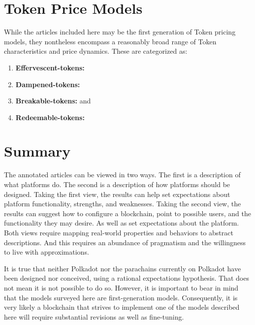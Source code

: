 \documentclass[11pt]{article}
\begin{document}
\section{Token Price Models}

While the articles included here may be the first generation of Token pricing models, they nontheless encompass a reasonably broad range of Token characteristics and price dynamics. These are categorized as:

\begin{enumerate}
    \item \textbf{Effervescent-tokens:} 
    \item \textbf{Dampened-tokens:} 
    \item \textbf{Breakable-tokens:}  and 
    \item \textbf{Redeemable-tokens:} 
\end{enumerate}

\section{Summary}

The annotated articles can be viewed in two ways. The first is a description of what platforms do. The second is a description of how platforms should be designed. Taking the first view, the results can help set expectations about platform functionality, strengths, and weaknesses. Taking the second view, the results can suggest how to configure a blockchain, point to possible users, and the functionality they may desire. As well as set expectations about the platform. Both views require mapping real-world properties and behaviors to abstract descriptions. And this requires an abundance of pragmatism and the willingness to live with approximations.

It is true that neither Polkadot nor the parachains currently on Polkadot have been designed nor conceived, using a rational expectations hypothesis.  That does not mean it is not possible to do so.  However, it is important to bear in mind that the models surveyed here are first-generation models. Consequently, it is very likely a blockchain that strives to implement one of the models described here will require substantial revisions as well as fine-tuning.

\clearpage
\begin{refsection}
\nocite{long20,cong21,cong22,sockin23a,sockin23b,rogoff22}
\printbibliography[heading=bibnumbered]
\end{refsection}
\end{document}
